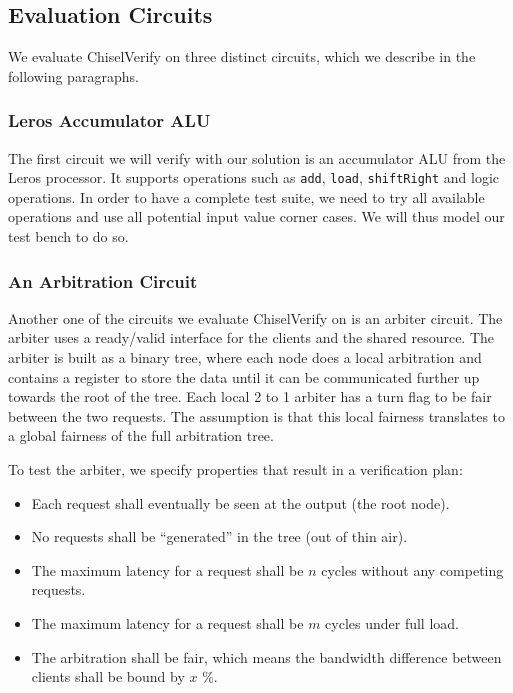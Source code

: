\documentclass[conference]{IEEEtran}
\begin{document}
\subsection{Evaluation Circuits}
We evaluate ChiselVerify on three distinct circuits, which we describe in the following paragraphs.

\subsubsection{Leros Accumulator ALU}

The first circuit we will verify with our solution is an accumulator ALU from the Leros processor.
It supports operations such as \texttt{add}, \texttt{load}, \texttt{shiftRight} and logic operations. 
In order to have a complete test suite, we need to try all available operations and use all potential input value corner cases.
We will thus model our test bench to do so.

\subsubsection{An Arbitration Circuit}

Another one of the circuits we evaluate ChiselVerify on is an arbiter circuit.
The arbiter uses a ready/valid interface for the clients and the shared resource. 
The arbiter is built as a binary tree, where each node does a local arbitration
and contains a register to store the data until it can be communicated further up towards the root of the
tree. Each local 2 to 1 arbiter has a turn flag to be fair between the two requests. The assumption is that
this local fairness translates to a global fairness of the full arbitration tree.

To test the arbiter, we specify properties that result in a verification plan:

\begin{itemize}
\item Each request shall eventually be seen at the output (the root node).
\item No requests shall be ``generated'' in the tree (out of thin air).
\item The maximum latency for a request shall be $n$ cycles without any competing requests.
\item The maximum latency for a request shall be $m$ cycles under full load.
\item The arbitration shall be fair, which means the bandwidth difference between clients shall be bound by $x$ \%.
\end{itemize}
\end{document}
